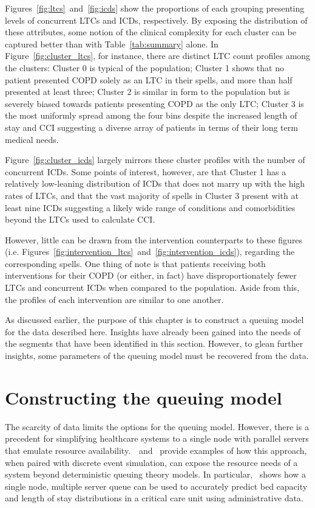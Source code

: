Figures~\ref{fig:ltcs}~and~\ref{fig:icds} show the proportions of each grouping
presenting levels of concurrent LTCs and ICDs, respectively. By exposing the
distribution of these attributes, some notion of the clinical complexity for
each cluster can be captured better than with Table~\ref{tab:summary} alone. In
Figure~\ref{fig:cluster_ltcs}, for instance, there are distinct LTC count
profiles among the clusters: Cluster 0 is typical of the population; Cluster 1
shows that no patient presented COPD solely as an LTC in their spells, and more
than half presented at least three; Cluster 2 is similar in form to the
population but is severely biased towards patients presenting COPD as the only
LTC; Cluster 3 is the most uniformly spread among the four bins despite the
increased length of stay and CCI suggesting a diverse array of patients in
terms of their long term medical needs.

Figure~\ref{fig:cluster_icds} largely mirrors these cluster profiles with the
number of concurrent ICDs. Some points of interest, however, are that Cluster 1
has a relatively low-leaning distribution of ICDs that does not marry up with
the high rates of LTCs, and that the vast majority of spells in Cluster 3
present with at least nine ICDs suggesting a likely wide range of conditions and
comorbidities beyond the LTCs used to calculate CCI.\

However, little can be drawn from the intervention counterparts to these figures
(i.e. Figures~\ref{fig:intervention_ltcs}~and~\ref{fig:intervention_icds}),
regarding the corresponding spells. One thing of note is that patients receiving
both interventions for their COPD (or either, in fact) have disproportionately
fewer LTCs and concurrent ICDs when compared to the population. Aside from this,
the profiles of each intervention are similar to one another.

As discussed earlier, the purpose of this chapter is to construct a queuing model
for the data described here. Insights have already been gained into the needs of
the segments that have been identified in this section. However, to glean
further insights, some parameters of the queuing model must be recovered from
the data.

\section{Constructing the queuing model}\label{sec:model}

The scarcity of data limits the options for the queuing model. However, there is
a precedent for simplifying healthcare systems to a single node with parallel
servers that emulate resource
availability.~\cite{Steins2013}~and~\cite{Williams2015} provide examples of
how this approach, when paired with discrete event simulation, can expose the
resource needs of a system beyond deterministic queuing theory models. In
particular,~\cite{Williams2015} shows how a single node, multiple server queue
can be used to accurately predict bed capacity and length of stay distributions
in a critical care unit using administrative data.

